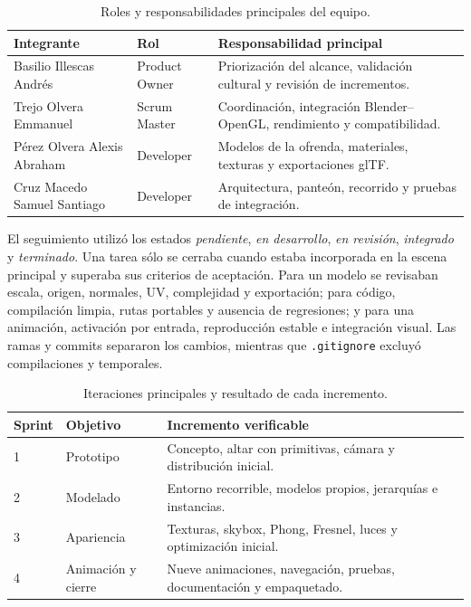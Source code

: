 \documentclass[letter,12pt]{article}
\begin{document}
	\begin{table}[H]
		\centering
		\small
		\begin{tabularx}{0.96\textwidth}{p{3.8cm}p{2.7cm}X}
			\toprule
			\textbf{Integrante} & \textbf{Rol} & \textbf{Responsabilidad principal}\\
			\midrule
			Basilio Illescas Andrés & Product Owner & Priorización del alcance, validación cultural y revisión de incrementos.\\
			Trejo Olvera Emmanuel & Scrum Master & Coordinación, integración Blender--OpenGL, rendimiento y compatibilidad.\\
			Pérez Olvera Alexis Abraham & Developer & Modelos de la ofrenda, materiales, texturas y exportaciones glTF.\\
			Cruz Macedo Samuel Santiago & Developer & Arquitectura, panteón, recorrido y pruebas de integración.\\
			\bottomrule
		\end{tabularx}
		\caption{Roles y responsabilidades principales del equipo.}
		\label{tab:roles}
	\end{table}

	El seguimiento utilizó los estados \textit{pendiente}, \textit{en desarrollo},
	\textit{en revisión}, \textit{integrado} y \textit{terminado}. Una tarea sólo
	se cerraba cuando estaba incorporada en la escena principal y superaba sus
	criterios de aceptación. Para un modelo se revisaban escala, origen, normales,
	UV, complejidad y exportación; para código, compilación limpia, rutas portables
	y ausencia de regresiones; y para una animación, activación por entrada,
	reproducción estable e integración visual. Las ramas y commits separaron los
	cambios, mientras que \texttt{.gitignore} excluyó compilaciones y temporales.

	\begin{table}[H]
		\centering
		\small
		\begin{tabularx}{0.96\textwidth}{p{1.4cm}p{3.5cm}X}
			\toprule
			\textbf{Sprint} & \textbf{Objetivo} & \textbf{Incremento verificable}\\
			\midrule
			1 & Prototipo & Concepto, altar con primitivas, cámara y distribución inicial.\\
			2 & Modelado & Entorno recorrible, modelos propios, jerarquías e instancias.\\
			3 & Apariencia & Texturas, skybox, Phong, Fresnel, luces y optimización inicial.\\
			4 & Animación y cierre & Nueve animaciones, navegación, pruebas, documentación y empaquetado.\\
			\bottomrule
		\end{tabularx}
		\caption{Iteraciones principales y resultado de cada incremento.}
		\label{tab:sprints}
	\end{table}
\end{document}
